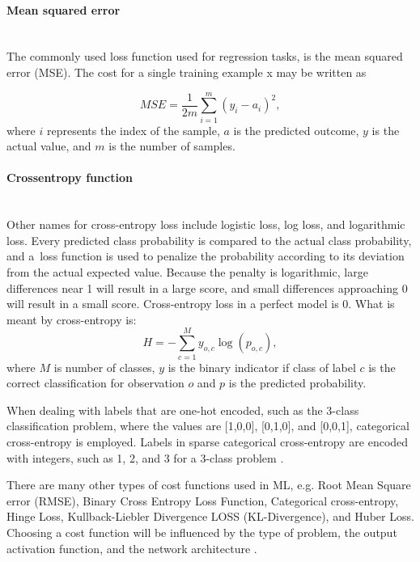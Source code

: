 \paragraph{Mean squared error}\mbox{}\\
The commonly used loss function used for regression tasks, is the mean squared error (MSE). 
The cost for a single training example x may be written as


\begin{equation}
	MSE = \frac{1}{2m} \sum_{i=1}^{m} (y_i - a_i)^2,
	\label{eq:mse}
\end{equation}
where
$i$ represents the index of the sample,
$a$ is the predicted outcome,
$y$ is the actual value, and
$m$ is the number of samples.

\paragraph{Crossentropy function}\mbox{}\\
Other names for cross-entropy loss include logistic loss, log loss, and logarithmic loss. Every predicted class probability is compared to the actual class probability, and a~loss function is used to penalize the probability according to its deviation from the actual expected value. Because the penalty is logarithmic, large differences near 1 will result in a large score, and small differences approaching 0 will result in a small score. Cross-entropy loss in a perfect model is 0.
What is meant by cross-entropy is:
\begin{equation}
	H = -\sum_{c=1}^My_{o,c}\log(p_{o,c}),
\end{equation}
where $M$ is number of classes, $y$ is the binary indicator if class of label $c$ is the correct classification for observation $o$ and $p$ is the predicted probability.

When dealing with labels that are one-hot encoded, such as the 3-class classification problem, where the values are [1,0,0], [0,1,0], and [0,0,1], categorical cross-entropy is employed.
Labels in sparse categorical cross-entropy are encoded with integers, such as 1, 2, and 3 for a 3-class problem \cite{inproceedings}.



There are many other types of cost functions used in ML, e.g. Root Mean Square error (RMSE), Binary Cross Entropy Loss Function,  Categorical cross-entropy, Hinge Loss, Kullback-Liebler Divergence LOSS (KL-Divergence), and Huber Loss. Choosing a cost function will be influenced by the type of problem, the output activation function, and the network architecture \cite{losses}.


